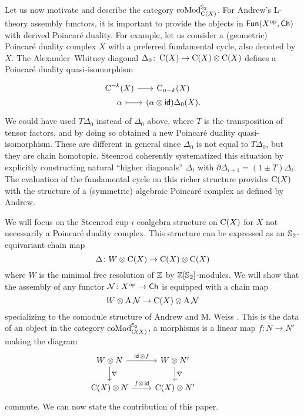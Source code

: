 Let us now motivate and describe the category $\operatorname{coMod}^{\mathbb{S}_2}_{\operatorname{C}(X)}$.
For Andrew's L-theory assembly functors, it is important to provide the objects in $\mathsf{Fun}(X^{\mathrm{op}}, \mathsf{Ch})$ with derived Poincar\'e duality.
For example, let us consider a (geometric) Poincar\'e duality complex $X$ with a preferred fundamental cycle, also denoted by $X$.
The Alexander--Whitney diagonal $\Delta_0 \colon \operatorname{C}(X) \to \operatorname{C}(X) \otimes \operatorname{C}(X)$ defines a Poincar\'e duality quasi-isomorphism
\[
\begin{tikzcd}[column sep=tiny,row sep=0]
	\cochains^{-k}(X) \arrow[r] & \chains_{n-k}(X) \\
	\alpha \arrow[r,mapsto] & (\alpha \ot \id)\Delta_0(X).
\end{tikzcd}
\]
We could have used $T\Delta_0$ instead of $\Delta_0$ above, where $T$ is the transposition of tensor factors, and by doing so obtained a new Poincar\'e duality quasi-isomorphism.
These are different in general since $\Delta_0$ is not equal to $T \Delta_0$, but they are chain homotopic.
Steenrod \cite{steenrod1947products} coherently systematized this situation by explicitly constructing natural ``higher diagonals'' $\Delta_i$ with $\partial \Delta_{i+1} = (1 \pm T) \Delta_i$.
The evaluation of the fundamental cycle on this richer structure provides $\operatorname{C}(X)$ with the structure of a (symmetric) algebraic Poincar\'e complex as defined by Andrew.

We will focus on the Steenrod cup-$i$ coalgebra structure on $\operatorname{C}(X)$ for $X$ not necessarily a Poincar\'e duality complex.
This structure can be expressed as an $\mathbb{S}_2$-equivariant chain map
\[
\Delta \colon W \otimes \operatorname{C}(X) \to \operatorname{C}(X) \otimes \operatorname{C}(X)
\]
where $W$ is the minimal free resolution of $\mathbb{Z}$ by $\mathbb{Z}[\mathbb{S}_2]$-modules.
We will show that the assembly of any functor $\mathcal{N} \colon X^{\mathrm{op}} \to \mathsf{Ch}$ is equipped with a chain map
\[
W \otimes \operatorname{A} \mathcal{N} \to \operatorname{C}(X) \otimes \operatorname{A} \mathcal{N}
\]
specializing to the comodule structure of Andrew and M. Weiss \cite[Proposition~5.3]{ranicki1990assembly}.
This is the data of an object in the category $\operatorname{coMod}^{\mathbb{S}_2}_{\operatorname{C}(X)}$, a morphisms is a linear map $f \colon N \to N'$ making the diagram
\[
\begin{tikzcd}
	W \ot N \arrow[d, "\nabla"] \arrow[r, "\id\, \ot f"] &
	W \ot N' \arrow[d, "\nabla"] & \\
	\chains(X) \ot N \arrow[r, "f \ot\, \id"] &
	\chains(X) \ot N'
\end{tikzcd}
\]
commute.
We can now state the contribution of this paper.

